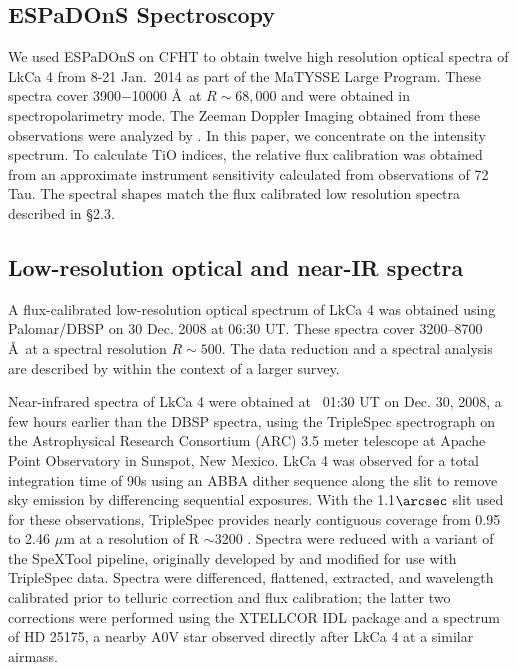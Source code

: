 \documentclass[twocolumn]{emulateapj}%
\newcommand{\name}{LkCa 4 }
\begin{document}
\subsection{ESPaDOnS Spectroscopy}
We used ESPaDOnS on CFHT to obtain twelve high resolution optical spectra of \name from 8-21 Jan.~2014 as part of the MaTYSSE Large Program.  These spectra cover 3900$-$10000 \AA\ at $R\sim68,000$ and were obtained in spectropolarimetry mode.  The Zeeman Doppler Imaging obtained from these observations were analyzed by \citet{donati14}.  In this paper, we concentrate on the intensity spectrum.  To calculate TiO indices, the relative flux calibration was obtained from an approximate instrument sensitivity calculated from observations of 72 Tau.  The spectral shapes match the flux calibrated low resolution spectra described in \S 2.3.


\subsection{Low-resolution optical and near-IR spectra}

A flux-calibrated low-resolution optical spectrum of LkCa 4 was obtained using Palomar/DBSP \citep[DBSP,][]{oke82} on 30 Dec. 2008 at 06:30 UT.  These spectra cover 3200--8700 \AA\ at a spectral resolution $R\sim 500$.  The data reduction and a spectral analysis are described by \citet{herczeg14} within the context of a larger survey.

Near-infrared spectra of LkCa 4 were obtained at ~01:30 UT on Dec. 30, 2008, a few hours earlier than the DBSP spectra, using the TripleSpec spectrograph on the Astrophysical Research Consortium (ARC) 3.5 meter telescope at Apache Point Observatory in Sunspot, New Mexico. LkCa 4 was observed for a total integration time of 90s using an ABBA dither sequence along the slit to remove sky emission by differencing sequential exposures.  With the 1.1$\arcsec$ slit used for these observations, TripleSpec provides nearly contiguous coverage from 0.95 to 2.46 $\mu$m at a resolution of  R $\sim$3200 \citep{wilson04}. Spectra were reduced with a variant of the SpeXTool pipeline, originally developed by \citet{cushing04} and modified for use with TripleSpec data. Spectra were differenced, flattened, extracted, and wavelength calibrated prior to telluric correction and flux calibration; the latter two corrections were performed using the XTELLCOR IDL package \citep{vacca03} and a spectrum of HD 25175, a nearby A0V star observed directly after LkCa 4 at a similar airmass. 
\end{document}
